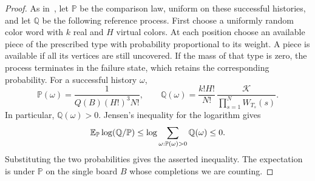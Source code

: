 \begin{proof}
As in~\cite[Section~3, Definitions~3.1 and~3.2]{ultimas}, let $\mathbb P$ be the comparison law,
uniform on these successful
histories, and let $\mathbb Q$ be the following reference process. First choose a uniformly random
color word with $k$ real and $H$ virtual colors. At each position choose an available piece of the
prescribed type with probability proportional to its weight. A piece is available if all its
vertices are still uncovered. If the mass of that type is zero, the process terminates in the
failure state, which retains the corresponding probability. For a successful history $\omega$,
\[
 \mathbb P(\omega)=\frac{1}{Q(B)(H!)^3N!},\qquad
 \mathbb Q(\omega)=\frac{k!H!}{N!}\,
             \frac{\mathcal K}{\prod_{s=1}^N W_{T_s}(s)} .
\]
In particular, $\mathbb Q(\omega)>0$. Jensen's inequality for the logarithm gives
\[
 \mathbb{E}_{\mathbb P}\log(\mathbb Q/\mathbb P)\le\log\sum_{\omega:\mathbb P(\omega)>0}\mathbb Q(\omega)\le0 .
\]
Substituting the two probabilities gives the asserted inequality. The expectation is under
$\mathbb P$ on the single board $B$ whose completions we are counting.
\end{proof}
